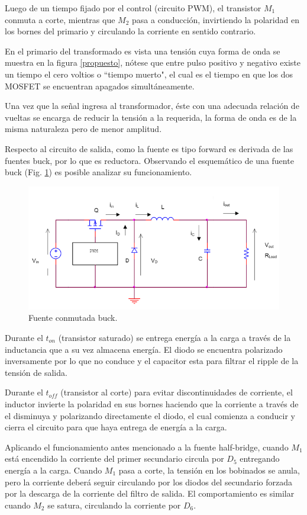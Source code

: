 \documentclass[11pt, a4paper]{article}
\begin{document}
Luego de un tiempo fijado por el control (circuito PWM), el transistor $M_1$ conmuta a corte, mientras que $M_2$ pasa a conducción, invirtiendo la polaridad en los bornes del primario y circulando la corriente en sentido contrario.

En el primario del transformado es vista una tensión cuya forma de onda se muestra en la figura \ref{propuesto}, nótese que entre pulso positivo y negativo existe un tiempo el cero voltios o ``tiempo muerto", el cual es el tiempo en que los dos MOSFET se encuentran apagados simultáneamente. 

Una vez que la señal ingresa al transformador, éste con una adecuada relación de vueltas se encarga de reducir la tensión a la requerida, la forma de onda es de la misma naturaleza pero de menor amplitud.

Respecto al circuito de salida, como la fuente es tipo forward es derivada de las fuentes buck, por lo que es reductora. Observando el esquemático de una fuente buck (Fig. \ref{buck}) es posible analizar su funcionamiento.
\begin{figure}[h]
	\centering
	\includegraphics[width = 10 cm]{Imagenes/buck}
	\caption{Fuente conmutada buck.}
	\label{buck}
\end{figure}

Durante el $t_{on}$ (transistor saturado) se entrega energía a la carga a través de la inductancia que a su vez almacena energía. El diodo se encuentra polarizado inversamente por lo que no conduce y el capacitor esta para filtrar el ripple de la tensión de salida.

Durante el $t_{off}$ (transistor al corte) para evitar discontinuidades de corriente, el inductor invierte la polaridad en sus bornes haciendo que la corriente a través de el disminuya y polarizando directamente el diodo, el cual comienza a conducir y cierra el circuito para que haya entrega de energía a la carga.

Aplicando el funcionamiento antes mencionado a la fuente half-bridge, cuando $M_1$ está encendido la corriente del primer secundario circula por $D_5$ entregando energía a la carga. Cuando $M_1$ pasa a corte, la tensión en los bobinados se anula, pero la corriente deberá seguir circulando por los diodos del secundario forzada por la descarga de la corriente del filtro de salida. El comportamiento es similar cuando $M_2$ se satura, circulando la corriente por $D_6$.
\end{document}
